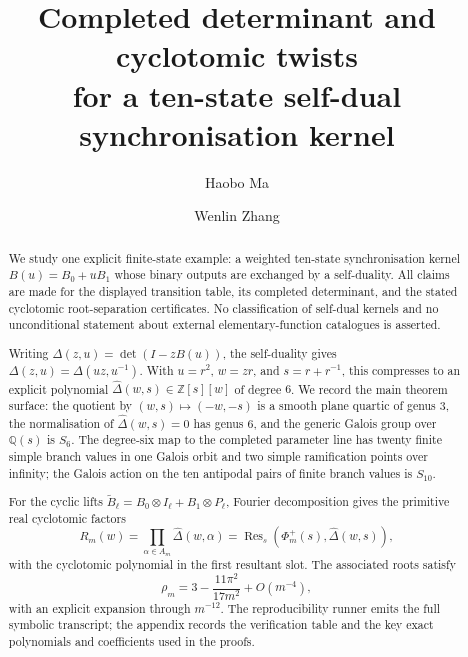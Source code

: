 \documentclass[10pt,a4paper]{amsart}
\title[Completed determinant and cyclotomic twists]{Completed determinant and cyclotomic twists\\
for a ten-state self-dual synchronisation kernel}
\author{Haobo Ma}
\author{Wenlin Zhang}
\date{}
\theoremstyle{plain}
\theoremstyle{definition}
\theoremstyle{remark}
\DeclareMathOperator{\Res}{Res}
\newcommand{\QQ}{\mathbb{Q}}
\newcommand{\ZZ}{\mathbb{Z}}
\begin{document}
\begin{abstract}
We study one explicit finite-state example: a weighted ten-state
synchronisation kernel
\(B(u)=B_0+uB_1\) whose binary outputs are exchanged by a self-duality.
All claims are made for the displayed transition table, its completed
determinant, and the stated cyclotomic root-separation certificates. No
classification of self-dual kernels and no unconditional statement
about external elementary-function catalogues is asserted.

Writing \(\Delta(z,u)=\det(I-zB(u))\), the self-duality gives
\(\Delta(z,u)=\Delta(uz,u^{-1})\).  With \(u=r^2\), \(w=zr\), and
\(s=r+r^{-1}\), this compresses to an explicit polynomial
\(\widehat\Delta(w,s)\in\ZZ[s][w]\) of degree \(6\).  We record the
main theorem surface: the quotient by
\((w,s)\mapsto(-w,-s)\) is a smooth plane quartic of genus \(3\), the
normalisation of \(\widehat\Delta(w,s)=0\) has genus \(6\), and the
generic Galois group over \(\QQ(s)\) is \(S_6\). The degree-six map to
the completed parameter line has twenty finite simple branch values in
one Galois orbit and two simple ramification points over infinity; the
Galois action on the ten antipodal pairs of finite branch values is
\(S_{10}\).

For the cyclic lifts
\(\widetilde B_\ell=B_0\otimes I_\ell+B_1\otimes P_\ell\), Fourier
decomposition gives the primitive real cyclotomic factors
\[
  R_m(w)=\prod_{\alpha\in A_m}\widehat\Delta(w,\alpha)
       =\Res_s(\Phi_m^+(s),\widehat\Delta(w,s)),
\]
with the cyclotomic polynomial in the first resultant slot.  The
associated roots satisfy
\[
  \rho_m
  =3-\frac{11\pi^2}{17m^2}+O(m^{-4}),
\]
with an explicit expansion through \(m^{-12}\). The reproducibility
runner emits the full symbolic transcript; the appendix records the
verification table and the key exact polynomials and coefficients used
in the proofs.
\end{abstract}


\maketitle










\end{document}
